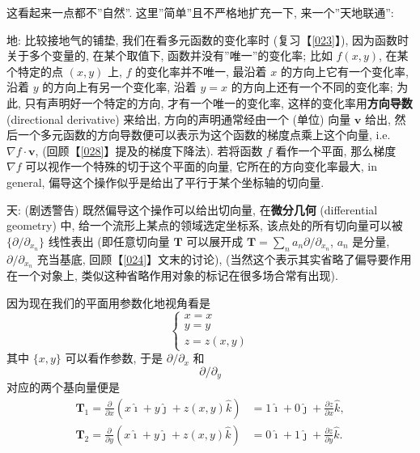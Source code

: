 \begin{newquote}
这看起来一点都不''自然''. 这里''简单''且不严格地扩充一下,
来一个''天地联通'':

地: 比较接地气的铺垫, 我们在看多元函数的变化率时 (复习【\ref{023}】),
因为函数时关于多个变量的, 在某个取值下, 函数并没有''唯一''的变化率; 比如
$f(x,y)$, 在某个特定的点 $(x,y)$ 上, $f$ 的变化率并不唯一, 最沿着
$x$ 的方向上它有一个变化率, 沿着 $y$ 的方向上有另一个变化率, 沿着
$y=x$ 的方向上还有一个不同的变化率; 为此, 只有声明好一个特定的方向,
才有一个唯一的变化率, 这样的变化率用\textbf{方向导数} (directional
derivative) 来给出, 方向的声明通常经由一个 (单位) 向量
$\boldsymbol{v}$ 给出,
然后一个多元函数的方向导数便可以表示为这个函数的梯度点乘上这个向量,
i.e.~$\nabla f\cdot\boldsymbol{v}$, (回顾【\ref{028}】提及的梯度下降法).
若将函数 $f$ 看作一个平面, 那么梯度 $\nabla f$
可以视作一个特殊的切于这个平面的向量, 它所在的方向变化率最大, in
general, 偏导这个操作似乎是给出了平行于某个坐标轴的切向量.

天: (剧透警告) 既然偏导这个操作可以给出切向量, 在\textbf{微分几何}
(differential geometry) 中, 给一个流形上某点的领域选定坐标系,
该点处的所有切向量可以被 $\{\partial/\partial_{x_n}\}$ 线性表出
(即任意切向量 $\boldsymbol{T}$ 可以展开成
$\boldsymbol{T}=\sum_na_n\partial/\partial_{x_n}$, $a_n$ 是分量,
$\partial/\partial_{x_n}$ 充当基底, 回顾【\ref{024}】文末的讨论),
(当然这个表示其实省略了偏导要作用在一个对象上,
类似这种省略作用对象的标记在很多场合常有出现).

因为现在我们的平面用参数化地视角看是 \[
\begin{cases}
x=x\\
y=y\\
z=z(x,y)
\end{cases}
\] 其中 $\{x,y\}$ 可以看作参数, 于是 $\partial/\partial_{x}$ 和
\[\partial/\partial_{y}\] 对应的两个基向量便是 \[
\begin{aligned}
\boldsymbol{T}_1=\frac{\partial}{\partial x}\left(x\hat{\imath}+y\hat{\jmath}+z(x,y)\hat{k}\right)&=1\hat{\imath}+0\hat{\jmath}+\frac{\partial z}{\partial x}\hat{k},\\
\boldsymbol{T}_2=\frac{\partial}{\partial y}\left(x\hat{\imath}+y\hat{\jmath}+z(x,y)\hat{k}\right)&=0\hat{\imath}+1\hat{\jmath}+\frac{\partial z}{\partial y}\hat{k}.
\end{aligned}
\]
\end{newquote}

